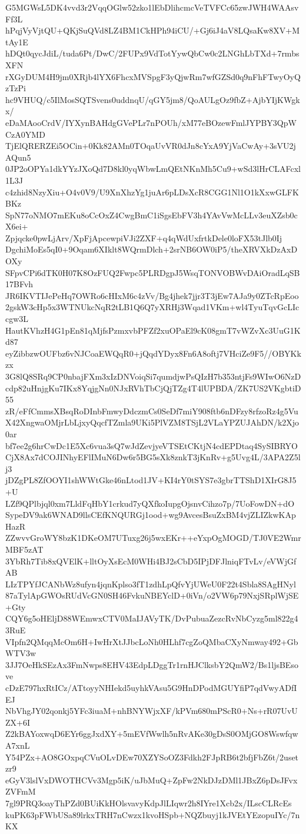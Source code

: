 G5MGWsL5DK4vvd3r2VqqOGlw52zko1lEbDlihcmcVeTVFCc65zwJWH4WAAsvFf3L
hPqjVyVjtQU+QKjSuQVd8LZ4BM1CkHPh94iCU/+Gj6iJ4aV8LQsaKw8XV+MtAy1E
hDQt0qycJdiL/tuda6Pt/DwC/2FUPx9VdTotYywQbCw0c2LNGhLbTXd+7rmbsXFN
rXGyDUM4H9jm0XRjb4lYX6FhcxMVSpgF3yQjwRm7wfGZSd0q9nFhFTwyOyQzTzPi
hc9VHUQ/c5IlMosSQTSvens0uddnqU/qGY5jm8/QoAULgOz9fbZ+AjbYIjKWgkx/
eDaMAooCrdV/IYXynBAHdgGVePLr7nPOUh/xM77eBOzewFmlJYPBY3QpWCzA0YMD
TjElQRERZEi5OCin+0Kk82AMn0TOqaUvVR0dJn8cYxA9YjVaCwAy+3sVU2jAQun5
0JP2oOPYa1dkYYzJXoQd7D8kl0yqWbwLmQEtNKnMh5Cu9+wSd3lHrCLAFcxl1L3J
c4zhid8NzyXiu+O4v0V9/U9XnXhzYg1juAr6pLDsXcR8CGG1Nl1O1kXxwGLFKBKz
SpN77oNMO7mEKu8oCcOxZ4CwgBmC1iSgsEbFV3h4YAvVwMcLLv3euXZsb0cX6ei+
Zpjqcke0pwLjArv/XpFjApcewpiVJi2ZXF+q4qWdUxfrtkDele0loFX53tJlb0Ij
DgchiMoEs5qI0+9Oqam6XIklt8WQrmDlch+2srNB6OW0iP5/theXRVXkDzAxDOXy
SFpvCPi6dTK0H07K8OzFUQ2Fwpc5PLRDgpJ5WsqTONVOBWvDAiOradLqSB17BFvh
JR6IKVTIJePeHq7OWRo6cHIxM6c4zVv/Bg4jhek7jjr3T3jEw7AJa9y0ZTcRpEoo
2gskW3cHp5x3WTNUkcNqR2tLB1Q6Q7yXRHj3Wqad1VKm+wl4TyuTqvGcLIccgw3L
HautKVhzH4G1pEn81qMjfsPzmxvbPFZf2xuOPaEl9cK08gmT7vWZvXc3UuG1Kd87
eyZibbzwOUFbz6vNJCoaEWQqR0+jQqdYDyx8Fn6A8oftj7VHciZe9F5//OBYKkzx
3G8lQ8SRq9CP0nbajFXm3xIzDNVoiqSi7qumdjwPsQIzH7b353ntjFs9WIwO6NzD
cdp82uHnjgKu7IKx8YqjgNn0NJxRVhTbCjQjTZg4T4lUPBDA/ZK7US2VKgbtiD55
zR/eFfCmmsXBsqRoDInbFmwyDdczmCs0SeDf7miY908ftb6nDFzy8rfzoRz4g5Vu
X42XngwaOMjrLbLjxyQqcfTZmla9UKi5PlVZM8TSjL2VLaYPZUJAhDN/k2Xjo0ar
bf7ee2g6hrCwDc1E5Xc6vua3sQ7wJdZevjyeVTSEtCKtjN4cdEPDtaq4SySIBRYO
CjX8Ax7dCOJINhyEFlIMuN6Dw6r5BG5sXk8znkT3jKnRv+g5Uvg4L/3APA2Z5lj3
jDZgPL8ZfOOYI1shWWtGke46nLtod1JV+KI4rY0tSYS7e3gbrTTShD1XIrG8J5+U
LZf9QPlbjql0xm7LldFqHbY1crkud7yQXfkoIupgOjsnvCihzo7p/7UoFowDN+dO
SypeDV9ak6WNAD9llsCEfKNQURGj1ood+wg9AvcesBsuZxBM4vjZLIZkwKApHazR
ZZwvvGroWY8bzK1DKeOM7UTuxg26j5wxEKr++eYxpOgMOGD/TJ0VE2WmrMBF5zAT
3YbRh7Tib8xQVElK+lltOyXsEcM0WHi4BJ2sCbD5IPjDFJlniqFTvLv/eVWjGfAB
LIzTPYfJCANbWz8ufyn4jqnKplso3fT1zdhLpQfvYjUWeU0F22t4Sbla8SAgHNyl
87aTylApGWOsRUdVcGN0SH46FvkuNBEYclD+0iVn/o2VW6p79NxjSRplWjSE+Gty
CQY6g5oHEljD88WEmwxCTV0MaIJAVyTK/DvPubuaZezcRvNbCyzg5ml822g43RuE
VIpfn2QMqqMcOm6H+IwHrXtJJbcLoNh0HLhf7cgZoQMbaCXyNmway492+GbWTV3w
3JJ7OeHkSEzAx3FmNwps8EHV43EdpLDggTr1rnHJClksbY2QmW2/Bs1ljsBEsove
cDzE797hxRtICz/ATtoyyNHIekd5uyhkVAsu5G9HnDPodMGUYfiP7qdVwyADfIEJ
NbVhgJY02qonkj5YFc3iuaM+nhBNYWjxXF/kPVm680mPScR0+Ns+rR07UvUZX+6I
Z2kBAYoxwqD6EYr6ggJxdXY+5mEVfWwlh5nRvAKe30gDsS0OMjGO8WswfqwA7xnL
Y54PZx+AO8GOxpqCVuOLvDEw70XZYSoOZ3Fdkh2FJpRB6t2bfjFbZ6t/2usetzr9
eGyV3lslVxDWOTHCVv3Mgp5iK/uJbMuQ+ZpFw2NkDJzDMl1JBxZ6pDsJFvxZVFmM
7gl9PRQ3oayThPZd0BUiKkHOlsvavyKdpJlLIqwr2h8IYre1Xcb2x/ILscCLRcEs
kuPK63pFWbUSa89lrkxTRH7nCwzx1kvoHSpb+NQZbuyj1kJVEtYEzopuIYc/7nKX
